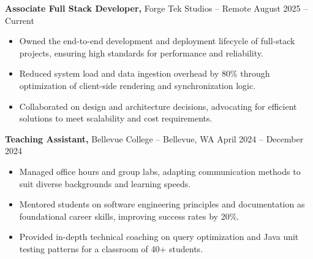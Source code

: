 \documentclass[11pt]{article}       %
\begin{document}
\textbf{Associate Full Stack Developer,} {Forge Tek Studios} -- Remote \hfill August 2025 -- Current 
\vspace{-9pt}
\begin{itemize}
  \item Owned the end-to-end development and deployment lifecycle of full-stack projects, ensuring high standards for performance and reliability.
  \item Reduced system load and data ingestion overhead by 80\% through optimization of client-side rendering and synchronization logic.
  \item Collaborated on design and architecture decisions, advocating for efficient solutions to meet scalability and cost requirements.
\end{itemize}

\textbf{Teaching Assistant,} {Bellevue College} -- Bellevue, WA \hfill April 2024 -- December 2024 \\
\vspace{-9pt}
\begin{itemize}
  \item Managed office hours and group labs, adapting communication methods to suit diverse backgrounds and learning speeds.
  \item Mentored students on software engineering principles and documentation as foundational career skills, improving success rates by 20\%.
  \item Provided in-depth technical coaching on query optimization and Java unit testing patterns for a classroom of 40+ students.
\end{itemize}

\end{document}

